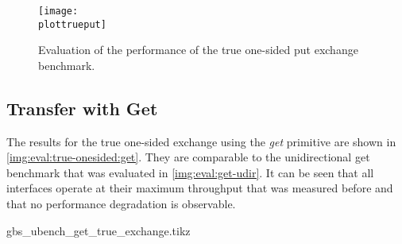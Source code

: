\begin{figure}[htb]
\centering
\texttt{[image: \\plottrueput]}
\caption{Evaluation of the performance of the true one-sided put exchange benchmark.}
\label{img:eval:true-onesided:put}
\end{figure}


\subsection{Transfer with Get}

The results for the true one-sided exchange using the \emph{get} primitive are shown in \autoref{img:eval:true-onesided:get}. They are comparable to the unidirectional get benchmark that was evaluated in \autoref{img:eval:get-udir}. It can be seen that all interfaces operate at their maximum throughput that was measured before and that no performance degradation is observable. 

\newcommand{\plottrueget}{gbs_ubench_get_true_exchange.tikz}
\begin{filecontents}{\plottrueget}

\newcommand{\csv}{gbs_ubench_get_true_exchange.csv}
\newcommand{\csvgi}{result-gi/\csv}
\newcommand{\csvte}{result-te/\csv}
\newcommand{\csvipoib}{result-ipoib/\csv}
\newcommand{\csvib}{result-ib/\csv}

\end{filecontents}


